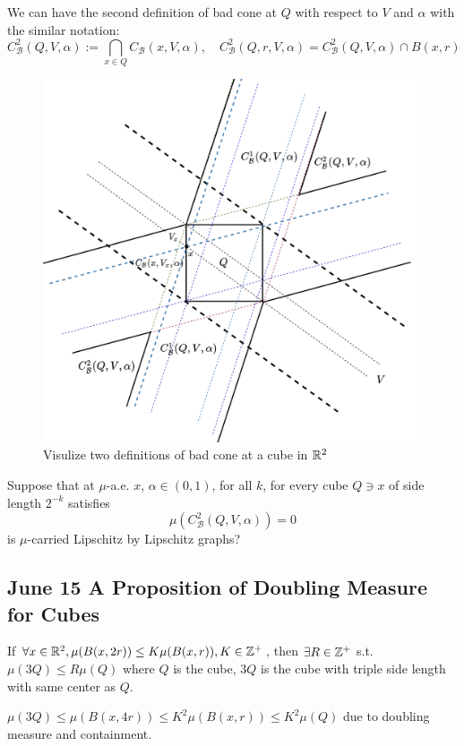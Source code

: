 \begin{definition}
    We can have the second definition of bad cone at $Q$ with respect to $V$ and $\alpha$ with the similar notation:
    $$C^2_{\mathcal{B}}(Q, V, \alpha) := \bigcap_{x\in Q} C_\mathcal{B}(x, V, \alpha), \quad
    C^2_{\mathcal{B}}(Q, r, V, \alpha) = C^2_{\mathcal{B}}(Q, V, \alpha) \cap B(x,r)
    $$
\end{definition}
\begin{figure}[H]
    \centering
    \includegraphics[width=.66\textwidth]{images/cubebadconeDef.png}
    \caption{Visulize two definitions of bad cone at a cube in $\mathbb{R}^2$}
\end{figure}

\begin{problem}
    Suppose that at $\mu$-a.e. $x$, $\alpha\in(0, 1)$, for all $k$, for every cube $Q\ni x$ of side length $2^{-k}$ satisfies
    $$
    \mu(C^2_\mathcal{B}(Q, V, \alpha)) = 0
    $$
    is $\mu$-carried Lipschitz by Lipschitz graphs?
\end{problem}

\newpage
\subsection{June 15 A Proposition of Doubling Measure for Cubes}

\begin{proposition}
    If $\forall x\in \mathbb{R}^2, \mu(B(x, 2r))\leq K\mu(B(x,r)), K\in\mathbb{Z}^+$, then $\exists R\in \mathbb{Z}^+$ s.t. $\mu(3Q)\leq R\mu(Q)$ where $Q$ is the cube, 3$Q$ is the cube with triple side length with same center as $Q$. 
\end{proposition}
\proof  $\mu(3Q) \leq \mu(B(x, 4r)) \leq K^2\mu(B(x, r))\leq K^2 \mu(Q)$ due to doubling measure and containment. 

